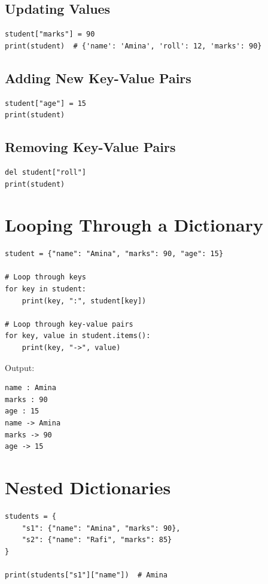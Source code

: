 \subsection{Updating Values}

\begin{verbatim}
student["marks"] = 90
print(student)  # {'name': 'Amina', 'roll': 12, 'marks': 90}
\end{verbatim}

\subsection{Adding New Key-Value Pairs}

\begin{verbatim}
student["age"] = 15
print(student)
\end{verbatim}

\subsection{Removing Key-Value Pairs}

\begin{verbatim}
del student["roll"]
print(student)
\end{verbatim}

\section{Looping Through a Dictionary}

\begin{verbatim}
student = {"name": "Amina", "marks": 90, "age": 15}

# Loop through keys
for key in student:
    print(key, ":", student[key])

# Loop through key-value pairs
for key, value in student.items():
    print(key, "->", value)
\end{verbatim}

Output:

\begin{verbatim}
name : Amina
marks : 90
age : 15
name -> Amina
marks -> 90
age -> 15
\end{verbatim}

\section{Nested Dictionaries}

\begin{verbatim}
students = {
    "s1": {"name": "Amina", "marks": 90},
    "s2": {"name": "Rafi", "marks": 85}
}

print(students["s1"]["name"])  # Amina
\end{verbatim}

